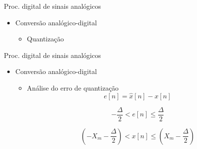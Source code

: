 \begin{slide}{Proc. digital de sinais anal\'ogicos}
\begin{itemize}
   \item Conversão analógico-digital
   \begin{itemize}
      \item Quantização 
      \begin{figure}
        \centering
      \end{figure}

   \end{itemize}
\end{itemize}
\end{slide}

\begin{slide}{Proc. digital de sinais anal\'ogicos}
\begin{itemize}
   \item Conversão analógico-digital
   \begin{itemize}
      \item Análise do erro de quantização
      \begin{equation}
        e[n] = \hat x[n] - x[n]
      \end{equation}

        \begin{equation}
         -\frac{\Delta}{2}<e[n]\leq \frac{\Delta}{2}
        \end{equation}

        \begin{equation}
         \left (-X_m-\frac{\Delta}{2}\right )<x[n]\leq \left (X_m-\frac{\Delta}{2}\right )
        \end{equation}



   \end{itemize}
\end{itemize}
\end{slide}

